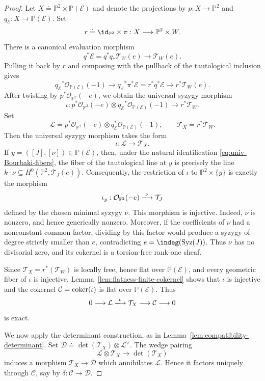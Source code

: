 \documentclass[11pt]{amsart} %
\newcommand{\lar}{\longrightarrow}
\theoremstyle{definition}
\def\syz{\mbox{\rm Syz}}
\def\coker{\mbox{\rm coker}}
\def\NZQ{\mathbb}               %
\def\PP{{\NZQ P}}
\def\T{{\mathcal T}}
\begin{document}
\begin{proof}
Let \(X\doteq\PP^2\times \PP(\mathcal E)\) and denote the projections by
\(
p:X\lar\PP^2\) and \(
q_\mathcal{E}:X\lar \PP(\mathcal E).
\)
Set
\[
r\doteq\id_{\PP^2}\times\pi:
X\longrightarrow\PP^2\times W.
\]
There is a canonical evaluation morphism
\[
q^*\mathcal E
=
q^*q_*\T_W(e)
\longrightarrow
\T_W(e).
\]
Pulling it back by $r$ and composing with the pullback of the
tautological inclusion gives
\[
{q_\mathcal{E}}^*\mathcal O_{\PP(\mathcal E)}(-1)
\longrightarrow
{q_\mathcal{E}}^*\pi^*\mathcal E
=
r^*q^*\mathcal E
\longrightarrow
r^*\T_W(e).
\]
After twisting by $p^*\mathcal O_{\PP^2}(-e)$, we obtain the
universal syzygy morphism
\[
\iota:
p^*\mathcal O_{\PP^2}(-e)
\otimes {q_\mathcal{E}}^*\mathcal O_{\PP(\mathcal E)}(-1)
\longrightarrow
r^*\T_W.
\]
Set
\[
\mathcal L
\doteq
p^*\mathcal O_{\PP^2}(-e)
\otimes
q_{\mathcal E}^*\mathcal O_{\PP(\mathcal E)}(-1),
\qquad
\mathcal T_X
\doteq
r^*\mathcal T_W.
\]
Then the universal syzygy morphism takes the form
\[
\iota:\mathcal L\longrightarrow\mathcal T_X.
\]
If \(
y=([J],[\nu])\in \PP(\mathcal E)\), then, under the natural identification \eqref{eq:univ-Bourbaki-fibers}, the fiber of the tautological line at $y$ is precisely the line \(k \cdot \nu\subseteq H^0(\PP^2,\T_J(e))\).
Consequently, the restriction of $\iota$ to
$\PP^2\times\{y\}$ is exactly the morphism
\[
\iota_y:
\mathcal O_{\PP^2}(-e)
\xlongrightarrow{\nu}
\T_J
\]
defined by the chosen minimal syzygy $\nu$. This morphism is injective. Indeed, $\nu$ is nonzero, and hence
generically nonzero. Moreover, if the coefficients of $\nu$ had a
nonconstant common factor, dividing by this factor would produce a
syzygy of degree strictly smaller than $e$, contradicting
\(e=\indeg(\syz(J))\). Thus $\nu$ has no divisorial zero, and its cokernel is a torsion-free
rank-one sheaf.

Since $\T_X = r^*(\T_W)$ is locally free, hence flat over $\mathbb{P}(\mathcal{E})$, and every geometric fiber of $\iota$ is injective, Lemma~\ref{lem:flatness-finite-cokernel} shows that $\iota$ is
injective and the cokernel \(\mathcal C\doteq\coker(\iota)\) is flat over $\mathbb{P}(\mathcal{E})$. Thus
\[
0\longrightarrow
\mathcal L
\xlongrightarrow{\iota}
\T_X
\longrightarrow
\mathcal C
\longrightarrow0
\]
is exact.

We now apply the determinant construction, as in Lemma~\ref{lem:compatibility-determinant}. Set \( \mathcal D \doteq \det(\T_X)\otimes\mathcal L^\vee\). The wedge pairing
\[
\mathcal L\otimes\T_X
\longrightarrow
\det(\T_X)
\]
induces a morphism \(\T_X\longrightarrow\mathcal D\) which annihilates $\mathcal L$. Hence it factors uniquely through $\mathcal C$, say by \(\bar\delta:
\mathcal C\longrightarrow\mathcal D\).


\end{proof}
\end{document}
